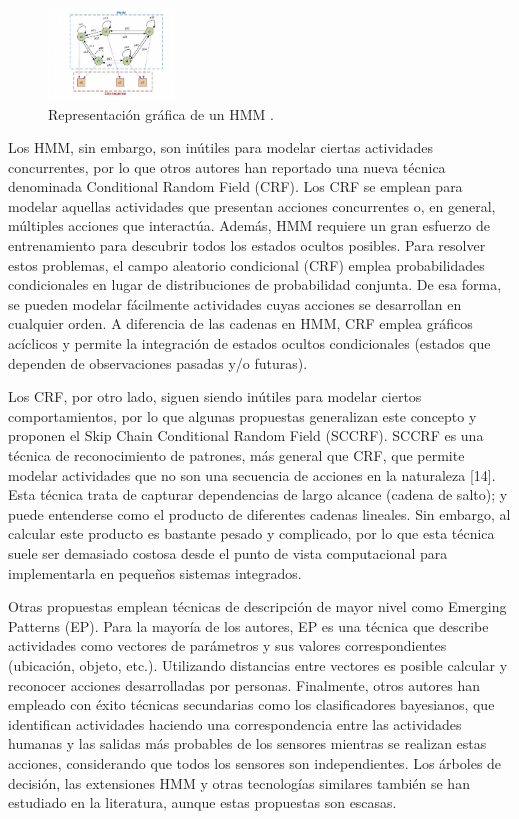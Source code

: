 \documentclass{article}
\begin{document}
\begin{figure}[h]
	\centering
	\includegraphics[width=0.3\textwidth]{punto2.png}
	\caption{\label{fig:frog}Representación gráfica de un HMM .}
\end{figure}

  Los HMM, sin embargo, son inútiles para modelar ciertas actividades concurrentes, por lo que otros autores han reportado una nueva técnica denominada Conditional Random Field (CRF). Los CRF se emplean para modelar aquellas actividades que presentan acciones concurrentes o, en general, múltiples acciones que interactúa. Además, HMM requiere un gran esfuerzo de entrenamiento para descubrir todos los estados ocultos posibles. Para resolver estos problemas, el campo aleatorio condicional (CRF) emplea probabilidades condicionales en lugar de distribuciones de probabilidad conjunta. De esa forma, se pueden modelar fácilmente actividades cuyas acciones se desarrollan en cualquier orden. A diferencia de las cadenas en HMM, CRF emplea gráficos acíclicos y permite la integración de estados ocultos condicionales (estados que dependen de observaciones pasadas y/o futuras).

  Los CRF, por otro lado, siguen siendo inútiles para modelar ciertos comportamientos, por lo que algunas propuestas generalizan este concepto y proponen el Skip Chain Conditional Random Field (SCCRF). SCCRF es una técnica de reconocimiento de patrones, más general que CRF, que permite modelar actividades que no son una secuencia de acciones en la naturaleza [14]. Esta técnica trata de capturar dependencias de largo alcance (cadena de salto); y puede entenderse como el producto de diferentes cadenas lineales. Sin embargo, al calcular este producto es bastante pesado y complicado, por lo que esta técnica suele ser demasiado costosa desde el punto de vista computacional para implementarla en pequeños sistemas integrados.

  Otras propuestas emplean técnicas de descripción de mayor nivel como Emerging Patterns (EP). Para la mayoría de los autores, EP es una técnica que describe actividades como vectores de parámetros y sus valores correspondientes (ubicación, objeto, etc.).  Utilizando distancias entre vectores es posible calcular y reconocer acciones desarrolladas por personas. Finalmente, otros autores han empleado con éxito técnicas secundarias como los clasificadores bayesianos, que identifican actividades haciendo una correspondencia entre las actividades humanas y las salidas más probables de los sensores mientras se realizan estas acciones, considerando que todos los sensores son independientes. Los árboles de decisión, las extensiones HMM y otras tecnologías similares también se han estudiado en la literatura, aunque estas propuestas son escasas.
\end{document}
